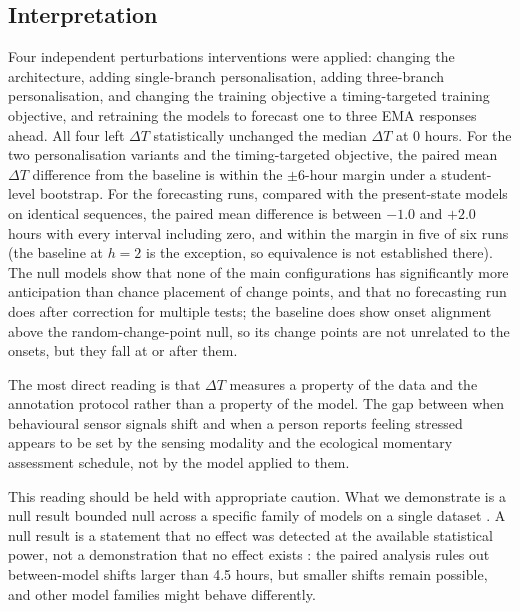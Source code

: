 \documentclass[preprint,12pt,authoryear]{elsarticle}
\newcommand{\dt}{$\Delta T$}
\providecommand{\DIFaddtex}[1]{{\protect\color{blue} \sf #1}} %
\providecommand{\DIFdeltex}[1]{{\protect\color{red} \scriptsize #1}} %
\providecommand{\DIFaddbegin}{} %
\providecommand{\DIFaddend}{} %
\providecommand{\DIFdelbegin}{} %
\providecommand{\DIFdelend}{} %
\providecommand{\DIFadd}[1]{\texorpdfstring{\DIFaddtex{#1}}{#1}} %
\providecommand{\DIFdel}[1]{\texorpdfstring{\DIFdeltex{#1}}{}} %
\newcommand{\DIFscaledelfig}{0.5}
\newlength{\DIFdelgraphicswidth} %
\newlength{\DIFdelgraphicsheight} %
\newcommand{\DIFaddincludegraphics}[2][]{{\color{blue}\fbox{\DIFOincludegraphics[#1]{#2}}}} %
\newcommand{\DIFdelincludegraphics}[2][]{%
\sbox{\DIFdelgraphicsbox}{\DIFOincludegraphics[#1]{#2}}%
\settoboxwidth{\DIFdelgraphicswidth}{\DIFdelgraphicsbox} %
\settoboxtotalheight{\DIFdelgraphicsheight}{\DIFdelgraphicsbox} %
\scalebox{\DIFscaledelfig}{%
\parbox[b]{\DIFdelgraphicswidth}{\usebox{\DIFdelgraphicsbox}\\[-\baselineskip] \rule{\DIFdelgraphicswidth}{0em}}\llap{\resizebox{\DIFdelgraphicswidth}{\DIFdelgraphicsheight}{%
\setlength{\unitlength}{\DIFdelgraphicswidth}%
\begin{picture}(1,1)%
\thicklines\linethickness{2pt} %
{\color[rgb]{1,0,0}\put(0,0){\framebox(1,1){}}}%
{\color[rgb]{1,0,0}\put(0,0){\line( 1,1){1}}}%
{\color[rgb]{1,0,0}\put(0,1){\line(1,-1){1}}}%
\end{picture}%
}\hspace*{3pt}}} %
} %
\DeclareRobustCommand{\DIFaddbegin}{\DIFOaddbegin \let\includegraphics\DIFaddincludegraphics} %
\DeclareRobustCommand{\DIFaddend}{\DIFOaddend \let\includegraphics\DIFOincludegraphics} %
\DeclareRobustCommand{\DIFdelbegin}{\DIFOdelbegin \let\includegraphics\DIFdelincludegraphics} %
\DeclareRobustCommand{\DIFdelend}{\DIFOaddend \let\includegraphics\DIFOincludegraphics} %
\begin{document}
\subsection{Interpretation}

Four \DIFdelbegin \DIFdel{independent perturbations }\DIFdelend \DIFaddbegin \DIFadd{interventions }\DIFaddend were applied: \DIFdelbegin \DIFdel{changing the architecture,
adding }\DIFdelend single-branch personalisation,
\DIFdelbegin \DIFdel{adding }\DIFdelend three-branch personalisation, \DIFdelbegin \DIFdel{and changing the training objective}\DIFdelend \DIFaddbegin \DIFadd{a timing-targeted training objective, and
retraining the models to forecast one to three EMA responses ahead}\DIFaddend . All
four left \DIFdelbegin \DIFdel{\dt{} statistically unchanged}\DIFdelend \DIFaddbegin \DIFadd{the median \dt{} at 0 hours. For the two personalisation
variants and the timing-targeted objective, the paired mean \dt{}
difference from the baseline is within the $\pm 6$-hour margin under a
student-level bootstrap. For the forecasting runs, compared with the
present-state models on identical sequences, the paired mean difference
is between $-1.0$ and $+2.0$ hours with every interval including zero,
and within the margin in five of six runs (the baseline at $h = 2$ is
the exception, so equivalence is not established there). The null
models show
that none of the main configurations has significantly more
anticipation than chance placement of change points, and that no
forecasting run does after correction for multiple tests; the baseline does show onset alignment
above the random-change-point null, so its change points are not
unrelated to the onsets, but they fall at or after them}\DIFaddend .

The most direct reading is that \dt{} measures a property of the data
and the annotation protocol rather than a property of the model. The
gap between when behavioural sensor signals shift and when a person
reports feeling stressed appears to be set by the sensing modality and
the ecological momentary assessment schedule, not by the model applied
to them.

This reading should be held with appropriate caution. What we
demonstrate is a \DIFdelbegin \DIFdel{null result }\DIFdelend \DIFaddbegin \DIFadd{bounded null }\DIFaddend across a specific family of models on a
single dataset\DIFdelbegin \DIFdel{. A null result is a statement that no effect was detected
at the available statistical power, not a demonstration that no effect
exists}\DIFdelend \DIFaddbegin \DIFadd{: the paired analysis rules out between-model shifts
larger than 4.5 hours, but smaller shifts remain possible, and other
model families might behave differently}\DIFaddend .
\end{document}
